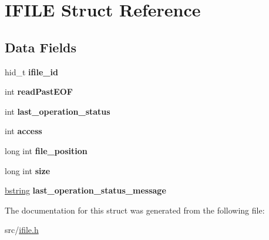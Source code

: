 \hypertarget{structIFILE}{}\section{I\+F\+I\+L\+E Struct Reference}
\label{structIFILE}
\subsection*{Data Fields}
\begin{DoxyCompactItemize}
\item 
\hypertarget{structIFILE_a9a90a3216e59f70b250485164613ba3e}{}hid\+\_\+t {\bfseries ifile\+\_\+id}\label{structIFILE_a9a90a3216e59f70b250485164613ba3e}

\item 
\hypertarget{structIFILE_afe6bfeb9e72329e93a895cc02aeea403}{}int {\bfseries read\+Past\+E\+O\+F}\label{structIFILE_afe6bfeb9e72329e93a895cc02aeea403}

\item 
\hypertarget{structIFILE_a73e75303b7d871cf59ec01d2d9da75ff}{}int {\bfseries last\+\_\+operation\+\_\+status}\label{structIFILE_a73e75303b7d871cf59ec01d2d9da75ff}

\item 
\hypertarget{structIFILE_a6403a5ba8f4f3e4ccd71534113be3ec1}{}int {\bfseries access}\label{structIFILE_a6403a5ba8f4f3e4ccd71534113be3ec1}

\item 
\hypertarget{structIFILE_a379d5ff17f315d42f5946e34f307da5c}{}long int {\bfseries file\+\_\+position}\label{structIFILE_a379d5ff17f315d42f5946e34f307da5c}

\item 
\hypertarget{structIFILE_ab3462b9a64d6caab822e07eba8e1d0b5}{}long int {\bfseries size}\label{structIFILE_ab3462b9a64d6caab822e07eba8e1d0b5}

\item 
\hypertarget{structIFILE_ae05dd37ae29cec828d76fa4a3999b357}{}\hyperlink{structtagbstring}{bstring} {\bfseries last\+\_\+operation\+\_\+status\+\_\+message}\label{structIFILE_ae05dd37ae29cec828d76fa4a3999b357}

\end{DoxyCompactItemize}


The documentation for this struct was generated from the following file\+:\begin{DoxyCompactItemize}
\item 
src/\hyperlink{ifile_8h}{ifile.\+h}\end{DoxyCompactItemize}
